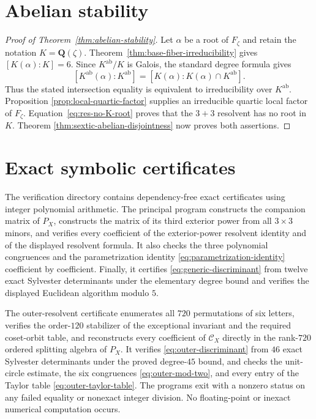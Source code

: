 \documentclass[11pt]{article}
\newcommand{\Q}{\mathbf Q}
\begin{document}
\section{Abelian stability}

\begin{proof}[Proof of Theorem~\ref{thm:abelian-stability}]
Let $\alpha$ be a root of $F_\zeta$ and retain the notation
$K=\Q(\zeta)$.  Theorem~\ref{thm:base-fiber-irreducibility} gives
$[K(\alpha):K]=6$.  Since $K^{\mathrm{ab}}/K$ is Galois, the standard
degree formula gives
\[
 [K^{\mathrm{ab}}(\alpha):K^{\mathrm{ab}}]
 =[K(\alpha):K(\alpha)\cap K^{\mathrm{ab}}].
\]
Thus the stated intersection equality is equivalent to irreducibility
over $K^{\mathrm{ab}}$.  Proposition
\ref{prop:local-quartic-factor} supplies an irreducible quartic local
factor of $F_\zeta$.  Equation~\eqref{eq:res-no-K-root} proves that the
$3+3$ resolvent has no root in $K$.  Theorem
\ref{thm:sextic-abelian-disjointness} now proves both assertions.
\end{proof}







\appendix

\section{Exact symbolic certificates}
\label{sec:exact-certificates}

The verification directory contains dependency-free exact certificates
using integer polynomial arithmetic.  The principal program constructs the companion matrix
of $P_X$, constructs the matrix of its third exterior power from all
$3\times3$ minors, and verifies every coefficient of the exterior-power
resolvent identity and of the displayed resolvent formula.  It also
checks the three polynomial congruences and the parametrization identity
\eqref{eq:parametrization-identity} coefficient by coefficient.  Finally,
it certifies \eqref{eq:generic-discriminant} from twelve exact Sylvester
determinants under the elementary degree bound and verifies the displayed
Euclidean algorithm modulo $5$.

The outer-resolvent certificate enumerates all $720$ permutations of
six letters, verifies the order-$120$ stabilizer of the exceptional
invariant and the required coset-orbit table, and reconstructs every
coefficient of $\mathcal C_X$ directly in the rank-$720$ ordered
splitting algebra of $P_X$.  It verifies
\eqref{eq:outer-discriminant} from $46$ exact Sylvester determinants
under the proved degree-$45$ bound, and checks the unit-circle estimate,
the six congruences \eqref{eq:outer-mod-two}, and every entry of the
Taylor table \eqref{eq:outer-taylor-table}.  The programs exit with a
nonzero status on any failed equality or nonexact integer division.  No
floating-point or inexact numerical computation occurs.
\end{document}
